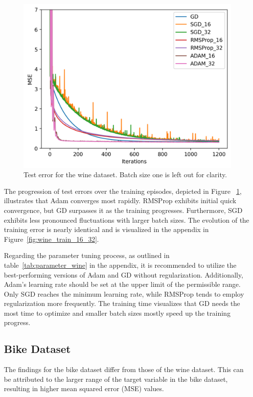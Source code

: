 \documentclass[10pt,conference,compsocconf]{IEEEtran}
\begin{document}
\begin{figure}[tbp]
	\centering
	\includegraphics[width=\columnwidth]{pictures/wine_test_16_32}
	\caption{Test error for the wine dataset. Batch size one is left out for clarity.}
	\vspace{-3mm}
	\label{fig:wine_test_16_32}
\end{figure}


The progression of test errors over the training episodes, depicted in Figure ~\ref{fig:wine_test_16_32}, illustrates that Adam converges most rapidly. 
RMSProp exhibits initial quick convergence, but GD surpasses it as the training progresses. 
Furthermore, SGD exhibits less pronounced fluctuations with larger batch sizes. 
The evolution of the training error is nearly identical and is visualized in the appendix in Figure~\ref{fig:wine_train_16_32}.

Regarding the parameter tuning process, as outlined in table~\ref{tab:parameter_wine} in the appendix, it is recommended to utilize the best-performing versions of Adam and GD without regularization. 
Additionally, Adam's learning rate should be set at the upper limit of the permissible range. 
Only SGD reaches the minimum learning rate, while RMSProp tends to employ regularization more frequently.
The training time visualizes that GD needs the most time to optimize and smaller batch sizes mostly speed up the training progress.


\subsection{Bike Dataset}
The findings for the bike dataset differ from those of the wine dataset. This can be attributed to the larger range of the target variable in the bike dataset, resulting in higher mean squared error (MSE) values.
\end{document}
